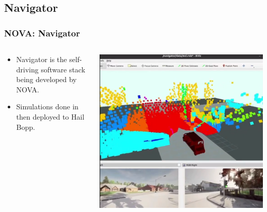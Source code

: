 \documentclass[aspectratio=169]{beamer}
\begin{document}
\subsection{Navigator}
\begin{frame}
	\frametitle{NOVA: Navigator \cite{nova}}
	\begin{columns}
		\begin{column}{0.4\textwidth}
			\begin{itemize}
				\item Navigator is the self-driving software stack being developed by NOVA.
				\item Simulations done in then deployed to Hail Bopp.
			\end{itemize}
		\end{column}
		\begin{column}{0.4\textwidth}
			\includegraphics[width = \columnwidth]{figs/NOVA-carla_screenshot.png}
		\end{column}
	\end{columns}
\end{frame}
\end{document}
